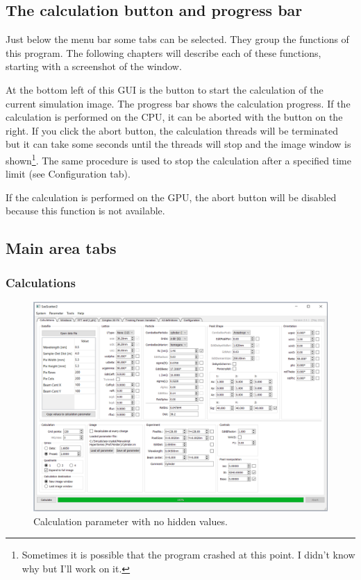 \documentclass[11pt]{article} %
\begin{document}
\subsection{The calculation button and progress bar}

Just below the menu bar some tabs can be selected. They group the functions of this program. The following chapters will describe each of these functions, starting with a screenshot of the window.

At the bottom left of this GUI is the button to start the calculation of the current simulation image. The progress bar shows the calculation progress. If the calculation is performed on the CPU, it can be aborted with the button on the right. If you click the abort button, the calculation threads will be terminated but it can take some seconds until the threads will stop and the image window is shown\footnote{Sometimes it is possible that the program crashed at this point. I didn't know why but I'll work on it.}. The same procedure is used to stop the calculation after a specified time limit (see Configuration tab).

If the calculation is performed on the GPU, the abort button will be disabled because this function is not available.


\clearpage
\subsection{Main area tabs}

\subsubsection{Calculations}
\begin{figure}[H]
 \centering
 \includegraphics[width=\textwidth]{gui-calculations-nohidden.png}
 \caption{Calculation parameter with no hidden values.}
\end{figure}
\end{document}

